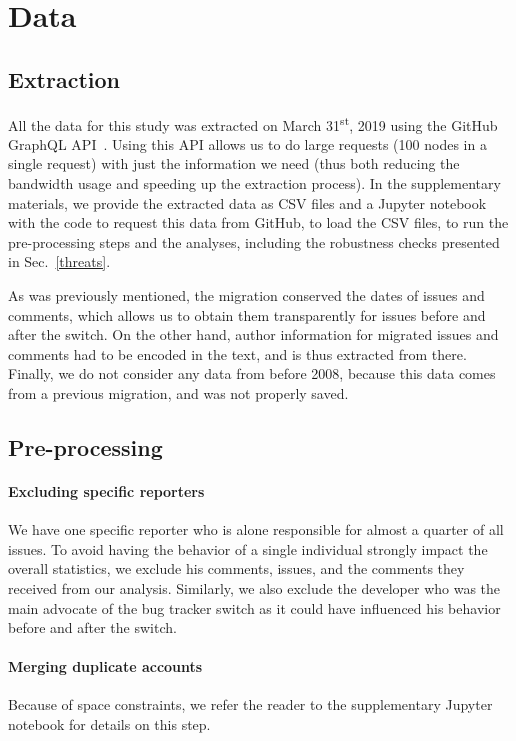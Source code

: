 \documentclass[conference]{IEEEtran}
\begin{document}
\section{Data}
\label{data}

\subsection{Extraction}

All the data for this study was extracted on March 31\textsuperscript{st}, 2019 using the GitHub GraphQL API~\cite{github_graphql_API}. Using this API allows us to do large requests (100 nodes in a single request) with just the information we need (thus both reducing the bandwidth usage and speeding up the extraction process). In the supplementary materials, we provide the extracted data as CSV files and a Jupyter notebook with the code to request this data from GitHub, to load the CSV files, to run the pre-processing steps and the analyses, including the robustness checks presented in Sec.~\ref{threats}.

As was previously mentioned, the migration conserved the dates of issues and comments, which allows us to obtain them transparently for issues before and after the switch.
On the other hand, author information for migrated issues and comments had to be encoded in the text, and is thus extracted from there.
Finally, we do not consider any data from before 2008, because this data comes from a previous migration, and was not properly saved.

\subsection{Pre-processing}

\label{pre-processing}

\paragraph{Excluding specific reporters}
We have one specific reporter who is alone responsible for almost a quarter of all issues. To avoid having the behavior of a single individual strongly impact the overall statistics, we exclude his comments, issues, and the comments they received from our analysis. Similarly, we also exclude the developer who was the main advocate of the bug tracker switch as it could have influenced his behavior before and after the switch.

\paragraph{Merging duplicate accounts}
Because of space constraints, we refer the reader to the supplementary Jupyter notebook for details on this step.
\end{document}
